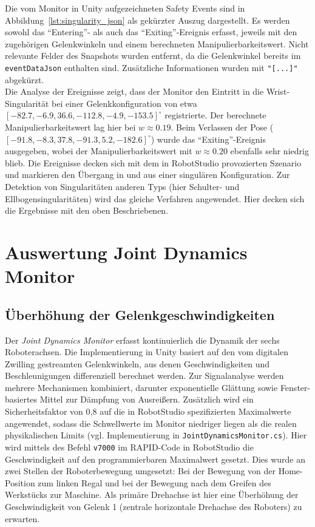 \noindent
Die vom Monitor in Unity aufgezeichneten Safety Events sind in
Abbildung~\ref{lst:singularity_json} als gekürzter Auszug
dargestellt. Es werden sowohl
das \enquote{Entering}- als auch das \enquote{Exiting}-Ereignis
erfasst, jeweils mit den
zugehörigen Gelenkwinkeln und einem berechneten
Manipulierbarkeitswert. Nicht relevante
Felder des Snapshots wurden entfernt, da die Gelenkwinkel bereits im
\texttt{eventDataJson}
enthalten sind. Zusätzliche Informationen wurden mit \texttt{"[...]"}
abgekürzt.\\

\noindent
Die Analyse der Ereignisse zeigt, dass der Monitor den Eintritt in
die Wrist-Singularität
bei einer Gelenkkonfiguration von etwa
$[-82.7, -6.9, 36.6, -112.8, -4.9, -153.5]^\circ$ registrierte. Der berechnete
Manipulierbarkeitswert lag hier bei $w \approx 0.19$. Beim Verlassen der Pose
($[-91.8, -8.3, 37.8, -91.3, 5.2, -182.6]^\circ$) wurde das
\enquote{Exiting}-Ereignis
ausgegeben, wobei der Manipulierbarkeitswert mit $w \approx 0.20$
ebenfalls sehr niedrig blieb.
Die Ereignisse decken sich mit dem in RobotStudio provozierten
Szenario und markieren den
Übergang in und aus einer singulären Konfiguration.
Zur Detektion von Singularitäten anderen Typs (hier Schulter- und
Ellbogensingularitäten) wird das gleiche Verfahren angewendet. Hier decken sich
die Ergebnisse mit den oben Beschriebenen.

\section{Auswertung Joint Dynamics Monitor}
\label{sec:Analyse_Sicherheit}

\subsection{Überhöhung der Gelenkgeschwindigkeiten}

Der \textit{Joint Dynamics Monitor} erfasst kontinuierlich die Dynamik der sechs
Roboterachsen. Die Implementierung in Unity basiert auf den vom digitalen
Zwilling gestreamten Gelenkwinkeln, aus denen Geschwindigkeiten und
Beschleunigungen differenziell berechnet werden. Zur Signalanalyse werden
mehrere Mechanismen kombiniert, darunter exponentielle Glättung sowie
Fenster-basiertes Mittel zur Dämpfung von Ausreißern. Zusätzlich wird ein
Sicherheitsfaktor von 0{,}8 auf die in RobotStudio spezifizierten Maximalwerte
angewendet, sodass die Schwellwerte im Monitor niedriger liegen als die realen
physikalischen Limits (vgl. Implementierung in
\texttt{JointDynamicsMonitor.cs}). Hier wird mittels des Befehl \texttt{v7000}
im RAPID-Code in RobotStudio die Geschwindigkeit auf den programmierbaren
Maximalwert gesetzt. Dies wurde an zwei Stellen der Roboterbewegung umgesetzt:
Bei der Bewegung von der Home-Position zum linken Regal und bei der Bewegung
nach dem Greifen des Werkstücks zur Maschine. Als primäre Drehachse ist hier
eine Überhöhung der Geschwindigkeit von Gelenk 1 (zentrale horizontale Drehachse
des Roboters) zu erwarten.

